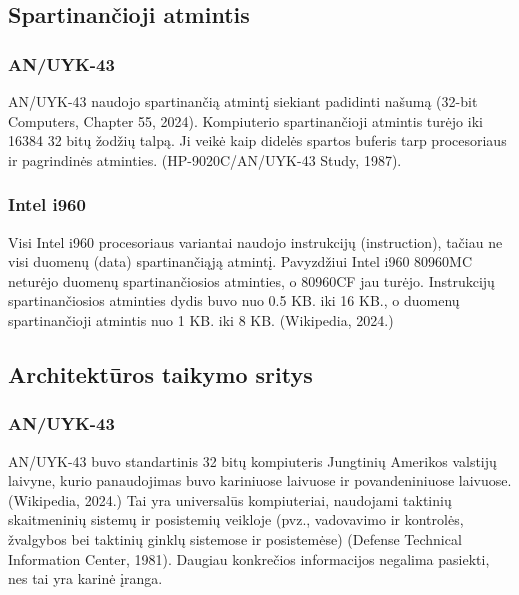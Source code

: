 \documentclass{article}
\begin{document}
\subsection{Spartinančioji atmintis}
\subsubsection{AN/UYK-43}
AN/UYK-43 naudojo spartinančią atmintį siekiant padidinti našumą (32-bit Computers, Chapter 55, 2024). Kompiuterio spartinančioji atmintis turėjo iki 16384 32 bitų žodžių talpą. Ji veikė kaip didelės spartos buferis tarp procesoriaus ir pagrindinės atminties. (HP-9020C/AN/UYK-43 Study, 1987).
\subsubsection{Intel i960}
Visi Intel i960 procesoriaus variantai naudojo instrukcijų (instruction), tačiau ne visi duomenų (data) spartinančiąją atmintį. Pavyzdžiui Intel i960 80960MC neturėjo duomenų spartinančiosios atminties, o 80960CF jau turėjo. Instrukcijų spartinančiosios atminties dydis buvo nuo 0.5 KB. iki 16 KB., o duomenų spartinančioji atmintis nuo 1 KB. iki 8 KB. (Wikipedia, 2024.)
\subsection{Architektūros taikymo sritys}
\subsubsection{AN/UYK-43}
AN/UYK-43 buvo standartinis 32 bitų kompiuteris Jungtinių Amerikos valstijų laivyne, kurio panaudojimas buvo kariniuose laivuose ir povandeniniuose laivuose. (Wikipedia, 2024.) Tai yra universalūs kompiuteriai, naudojami taktinių skaitmeninių sistemų ir posistemių veikloje (pvz., vadovavimo ir kontrolės, žvalgybos bei taktinių ginklų sistemose ir posistemėse) (Defense Technical Information Center, 1981). Daugiau konkrečios informacijos negalima pasiekti, nes tai yra karinė įranga.
\end{document}
